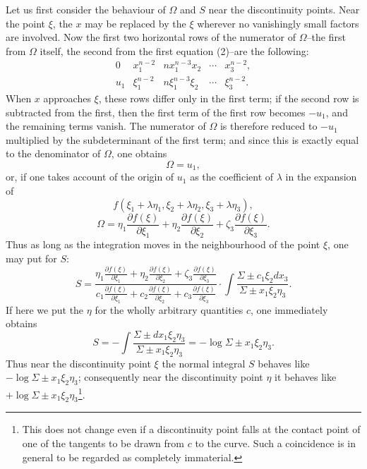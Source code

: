 \documentclass[10pt]{article}
\begin{document}
Let us first consider the behaviour of $\Omega$ and $S$ near the discontinuity points. Near the point $\xi$, the $x$ may be replaced by the $\xi$ wherever no vanishingly small factors are involved. Now the first two horizontal rows of the numerator of $\Omega$--the first from $\Omega$ itself, the second from the first equation (2)--are the following:
\[
\begin{array}{cccccc}
0 & x_1^{n-2} & nx_1^{n-3}x_2 & \cdots & x_3^{n-2},\\
u_1 & \xi_1^{n-2} & n\xi_1^{n-3}\xi_2 & \cdots & \xi_3^{n-2}.
\end{array}
\]
When $x$ approaches $\xi$, these rows differ only in the first term; if the second row is subtracted from the first, then the first term of the first row becomes $-u_1$, and the remaining terms vanish. The numerator of $\Omega$ is therefore reduced to $-u_1$ multiplied by the subdeterminant of the first term; and since this is exactly equal to the denominator of $\Omega$, one obtains
\[
\Omega=u_1,
\]
or, if one takes account of the origin of $u_1$ as the coefficient of $\lambda$ in the expansion of
\[
f(\xi_1+\lambda\eta_1,\xi_2+\lambda\eta_2,\xi_3+\lambda\eta_3),
\]
\[
\Omega=\eta_1\frac{\partial f(\xi)}{\partial \xi_1}+\eta_2\frac{\partial f(\xi)}{\partial \xi_2}+\zeta_3\frac{\partial f(\xi)}{\partial \xi_3}.
\]
Thus as long as the integration moves in the neighbourhood of the point $\xi$, one may put for $S$:
\[
S=\frac{\eta_1\frac{\partial f(\xi)}{\partial \xi_1}+\eta_2\frac{\partial f(\xi)}{\partial \xi_2}+\zeta_3\frac{\partial f(\xi)}{\partial \xi_3}}{c_1\frac{\partial f(\xi)}{\partial \xi_1}+c_2\frac{\partial f(\xi)}{\partial \xi_2}+c_3\frac{\partial f(\xi)}{\partial \xi_3}}
\cdot
\int\frac{\Sigma\pm c_1\xi_2dx_3}{\Sigma\pm x_1\xi_2\eta_3}.
\]
If here we put the $\eta$ for the wholly arbitrary quantities $c$, one immediately obtains
\[
S=-\int\frac{\Sigma\pm dx_1\xi_2\eta_3}{\Sigma\pm x_1\xi_2\eta_3}=-\log\Sigma\pm x_1\xi_2\eta_3.
\]
Thus near the discontinuity point $\xi$ the normal integral $S$ behaves like $-\log\Sigma\pm x_1\xi_2\eta_3$; consequently near the discontinuity point $\eta$ it behaves like $+\log\Sigma\pm x_1\xi_2\eta_3$\footnote{This does not change even if a discontinuity point falls at the contact point of one of the tangents to be drawn from $c$ to the curve. Such a coincidence is in general to be regarded as completely immaterial.}.
\end{document}
